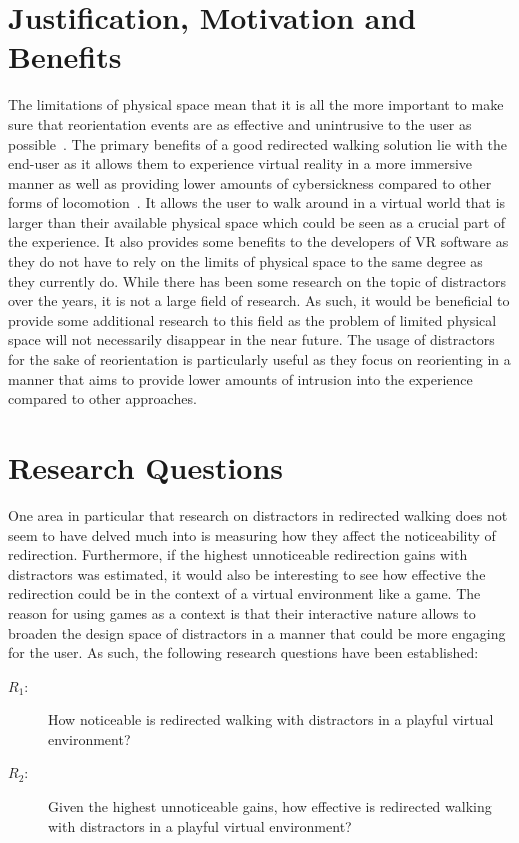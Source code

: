\section{Justification, Motivation and Benefits}
The limitations of physical space mean that it is all the more important to make sure that reorientation events are as effective and unintrusive to the user as possible~\cite{azmandian2015physical}. The primary benefits of a good redirected walking solution lie with the end-user as it allows them to experience virtual reality in a more immersive manner as well as providing lower amounts of cybersickness compared to other forms of locomotion~\cite{razzaque2001redirected, peck2011evaluation}. It allows the user to walk around in a virtual world that is larger than their available physical space which could be seen as a crucial part of the experience. It also provides some benefits to the developers of VR software as they do not have to rely on the limits of physical space to the same degree as they currently do. While there has been some research on the topic of distractors over the years, it is not a large field of research. As such, it would be beneficial to provide some additional research to this field as the problem of limited physical space will not necessarily disappear in the near future. The usage of distractors for the sake of reorientation is particularly useful as they focus on reorienting in a manner that aims to provide lower amounts of intrusion into the experience compared to other approaches.

\section{Research Questions}\label{research:questions}
One area in particular that research on distractors in redirected walking does not seem to have delved much into is measuring how they affect the noticeability of redirection. Furthermore, if the highest unnoticeable redirection gains with distractors was estimated, it would also be interesting to see how effective the redirection could be in the context of a virtual environment like a game. The reason for using games as a context is that their interactive nature allows to broaden the design space of distractors in a manner that could be more engaging for the user. As such, the following research questions have been established:
\begin{description}
\item[$R_1$: ] How noticeable is redirected walking with distractors in a playful virtual environment?
\item[$R_2$: ] Given the highest unnoticeable gains, how effective is redirected walking with distractors in a playful virtual environment?
\end{description}

